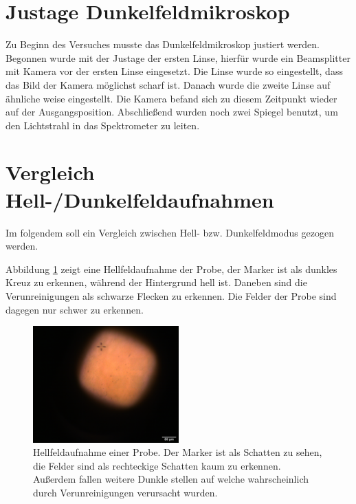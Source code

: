 
\section{Justage Dunkelfeldmikroskop}
Zu Beginn des Versuches musste das Dunkelfeldmikroskop justiert werden. Begonnen wurde mit der Justage der ersten Linse, hierfür wurde ein Beamsplitter mit Kamera vor der ersten Linse eingesetzt. Die Linse wurde so eingestellt, dass das Bild der Kamera möglichst scharf ist. Danach wurde die zweite Linse auf ähnliche weise eingestellt. Die Kamera befand sich zu diesem Zeitpunkt wieder auf der Ausgangsposition. Abschließend wurden noch zwei Spiegel benutzt, um den Lichtstrahl in das Spektrometer zu leiten.

\section{Vergleich Hell-/Dunkelfeldaufnahmen}
Im folgendem soll ein Vergleich zwischen Hell- bzw. Dunkelfeldmodus gezogen werden.

Abbildung \ref{fig:312-HF} zeigt eine Hellfeldaufnahme der Probe, der Marker ist als dunkles Kreuz zu erkennen, während der Hintergrund hell ist. Daneben sind die Verunreinigungen als schwarze Flecken zu erkennen. Die Felder der Probe sind dagegen nur schwer zu erkennen.
\begin{figure}[h]
    \centering
    \includegraphics[width=0.5\textwidth]{Bilder/Auswertung/3.1/image_0.png}
    \caption{Hellfeldaufnahme einer Probe. Der Marker ist als Schatten zu sehen, die Felder sind als rechteckige Schatten kaum zu erkennen. Außerdem fallen weitere Dunkle stellen auf welche wahrscheinlich durch Verunreinigungen verursacht wurden.}
    \label{fig:312-HF}
\end{figure}

